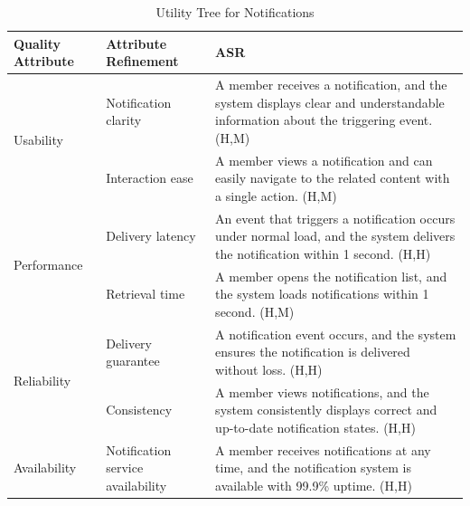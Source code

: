 \documentclass{article}
\begin{document}
\begin{table}[H]
    \centering
    \caption{Utility Tree for Notifications}
    \begin{tabular}{|p{3cm}|p{4cm}|p{7cm}|}
        \hline
        \textbf{Quality Attribute} & \textbf{Attribute Refinement}                                                                                                    & \textbf{ASR} \\
        \hline

        \multirow{2}{*}{Usability}
                                   & Notification clarity
                                   & A member receives a notification, and the system displays clear and understandable information about the triggering event. (H,M)                \\
        \cline{2-3}
                                   & Interaction ease
                                   & A member views a notification and can easily navigate to the related content with a single action. (H,M)                                        \\
        \hline

        \multirow{2}{*}{Performance}
                                   & Delivery latency
                                   & An event that triggers a notification occurs under normal load, and the system delivers the notification within 1 second. (H,H)                 \\
        \cline{2-3}
                                   & Retrieval time
                                   & A member opens the notification list, and the system loads notifications within 1 second. (H,M)                                                 \\
        \hline

        \multirow{2}{*}{Reliability}
                                   & Delivery guarantee
                                   & A notification event occurs, and the system ensures the notification is delivered without loss. (H,H)                                           \\
        \cline{2-3}
                                   & Consistency
                                   & A member views notifications, and the system consistently displays correct and up-to-date notification states. (H,H)                            \\
        \hline

        Availability
                                   & Notification service availability
                                   & A member receives notifications at any time, and the notification system is available with 99.9\% uptime. (H,H)                                 \\
        \hline


\end{tabular}
\end{table}
\end{document}
